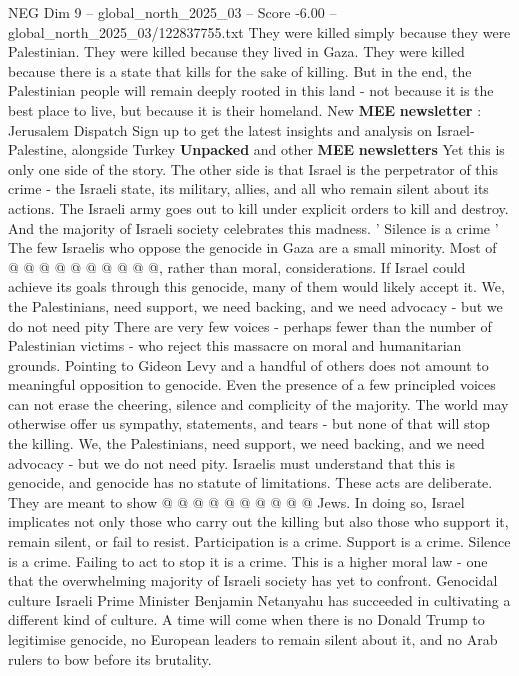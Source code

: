 \begin{textsample}{NEG Dim 9 – global\_north\_2025\_03 – Score -6.00 – global\_north\_2025\_03/122837755.txt}  \label{ex:f9_neg_069}
They were killed simply because they were Palestinian.
They were killed because they lived in Gaza.
They were killed because there is a state that kills for the sake of killing.
But in the end, the Palestinian people will remain deeply rooted in this land - not because it is the best place to live, but because it is their homeland.
New \textbf{MEE} \textbf{newsletter} : Jerusalem Dispatch Sign up to get the latest insights and analysis on Israel-Palestine, alongside Turkey \textbf{Unpacked} and other \textbf{MEE} \textbf{newsletters} Yet this is only one side of the story.
The other side is that Israel is the perpetrator of this crime - the Israeli state, its military, allies, and all who remain silent about its actions.
The Israeli army goes out to kill under explicit orders to kill and destroy.
And the majority of Israeli society celebrates this madness. ' Silence is a crime ' The few Israelis who oppose the genocide in Gaza are a small minority.
Most of @ @ @ @ @ @ @ @ @ @, rather than moral, considerations.
If Israel could achieve its goals through this genocide, many of them would likely accept it.
We, the Palestinians, need support, we need backing, and we need advocacy - but we do not need pity There are very few voices - perhaps fewer than the number of Palestinian victims - who reject this massacre on moral and humanitarian grounds.
Pointing to Gideon Levy and a handful of others does not amount to meaningful opposition to genocide.
Even the presence of a few principled voices can not erase the cheering, silence and complicity of the majority.
The world may otherwise offer us sympathy, statements, and tears - but none of that will stop the killing.
We, the Palestinians, need support, we need backing, and we need advocacy - but we do not need pity.
Israelis must understand that this is genocide, and genocide has no statute of limitations.
These acts are deliberate.
They are meant to show @ @ @ @ @ @ @ @ @ @ Jews.
In doing so, Israel implicates not only those who carry out the killing but also those who support it, remain silent, or fail to resist.
Participation is a crime.
Support is a crime.
Silence is a crime.
Failing to act to stop it is a crime.
This is a higher moral law - one that the overwhelming majority of Israeli society has yet to confront.
Genocidal culture Israeli Prime Minister Benjamin Netanyahu has succeeded in cultivating a different kind of culture.
A time will come when there is no Donald Trump to legitimise genocide, no European leaders to remain silent about it, and no Arab rulers to bow before its brutality.

\end{textsample}
